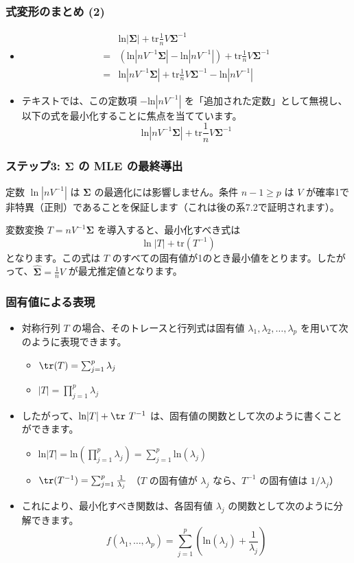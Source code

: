 \documentclass{beamer}
\begin{document}
\begin{frame}
    \frametitle{式変形のまとめ (2)}
    \begin{itemize}
        \item
        \begin{align*}
        &\text{ln}|\bm{\Sigma}|+\text{tr}\frac{1}{n}V\bm{\Sigma}^{-1} \\
        =&(\text{ln}|nV^{-1}\bm{\Sigma}|-\text{ln}|nV^{-1}|)+\text{tr}\frac{1}{n}V\bm{\Sigma}^{-1} \\
        =&\text{ln}|nV^{-1}\bm{\Sigma}|+\text{tr}\frac{1}{n}V\bm{\Sigma}^{-1}-\text{ln}|nV^{-1}|
        \end{align*}
        \item テキストでは、この定数項 $-\text{ln}|nV^{-1}|$ を「追加された定数」として無視し、以下の式を最小化することに焦点を当てています。
        \[
        \text{ln}|nV^{-1}\bm{\Sigma}|+\text{tr}\frac{1}{n}V\bm{\Sigma}^{-1}
        \]
    \end{itemize}
\end{frame}

\begin{frame}
\frametitle{ステップ3: $\bm{\Sigma}$ の MLE の最終導出}
定数 $\ln|nV^{-1}|$ は $\bm{\Sigma}$ の最適化には影響しません。条件 $n-1 \ge p$ は $V$ が確率1で非特異（正則）であることを保証します（これは後の系7.2で証明されます）。

変数変換 $T = nV^{-1}\bm{\Sigma}$ を導入すると、最小化すべき式は
\[
\ln|T| + \mathrm{tr}(T^{-1})
\]
となります。この式は $T$ のすべての固有値が1のとき最小値をとります。したがって、$\hat{\bm{\Sigma}} = \frac{1}{n}V$ が最尤推定値となります。
\end{frame}

\begin{frame}
\frametitle{固有値による表現}
\begin{itemize}
    \item 対称行列 $T$ の場合、そのトレースと行列式は固有値 $\lambda_1,\lambda_2,\dots,\lambda_p$ を用いて次のように表現できます。
    \begin{itemize}
        \item $\tr(T)=\sum_{j=1}^{p}\lambda_j$
        \item $|T|=\prod_{j=1}^{p}\lambda_j$
    \end{itemize}
    \item したがって、$\text{ln}|T|+\tr~T^{-1}$ は、固有値の関数として次のように書くことができます。
    \begin{itemize}
        \item $\text{ln}|T|=\text{ln}(\prod_{j=1}^{p}\lambda_j)=\sum_{j=1}^{p}\text{ln}(\lambda_j)$
        \item $\tr(T^{-1})=\sum_{j=1}^{p}\frac{1}{\lambda_j}$ （$T$ の固有値が $\lambda_j$ なら、$T^{-1}$ の固有値は $1/\lambda_j$）
    \end{itemize}
    \item これにより、最小化すべき関数は、各固有値 $\lambda_j$ の関数として次のように分解できます。
    \[ f(\lambda_1,\dots,\lambda_p)=\sum_{j=1}^{p}\left(\text{ln}(\lambda_j)+\frac{1}{\lambda_j}\right) \]
\end{itemize}
\end{frame}
\end{document}
